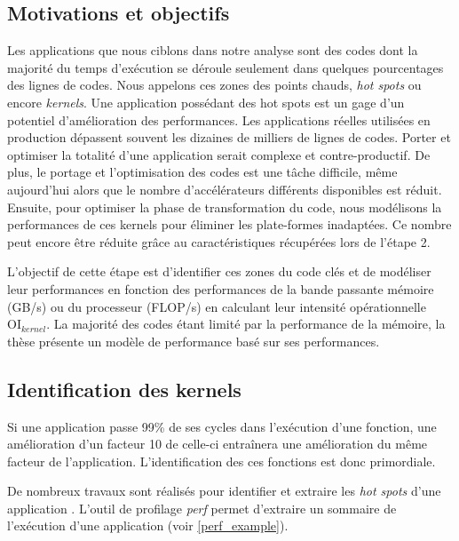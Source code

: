 \subsection{Motivations et objectifs}



Les applications que nous ciblons dans notre analyse sont des codes dont la majorité du temps d'exécution se déroule seulement dans quelques pourcentages des lignes de codes. Nous appelons ces zones des points chauds, \textit{hot spots} ou encore \textit{kernels}. Une application possédant des hot spots est un gage d'un potentiel d'amélioration des performances. Les applications réelles utilisées en production dépassent souvent les dizaines de milliers de lignes de codes. Porter et optimiser la totalité d'une application serait complexe et contre-productif. De plus, le portage et l'optimisation des codes est une tâche difficile, même aujourd'hui alors que le nombre d'accélérateurs différents disponibles est réduit. Ensuite, pour optimiser la phase de transformation du code, nous modélisons la performances de ces kernels pour éliminer les plate-formes inadaptées. Ce nombre peut encore être réduite grâce au caractéristiques récupérées lors de l'étape 2.  


L'objectif de cette étape est d'identifier ces zones du code clés et de modéliser leur performances en fonction des performances de la bande passante mémoire (GB/s) ou du processeur (FLOP/s) en calculant leur intensité opérationnelle $\text{OI}_{kernel}$. La majorité des codes étant limité par la performance de la mémoire, la thèse présente un modèle de performance basé sur ses performances. 


\subsection{Identification des kernels}

Si une application passe 99\% de ses cycles dans l'exécution d'une fonction, une amélioration d'un facteur 10 de celle-ci entraînera une amélioration du même facteur de l'application. L'identification des ces fonctions est donc primordiale. 

De nombreux travaux sont réalisés pour identifier et extraire les \textit{hot spots} d'une application \cite{castro2015cere, brunst2013custom}. L'outil de profilage \textit{perf} \cite{de2010new} permet d'extraire un sommaire de l'exécution d'une application (voir \autoref{perf_example}). 



